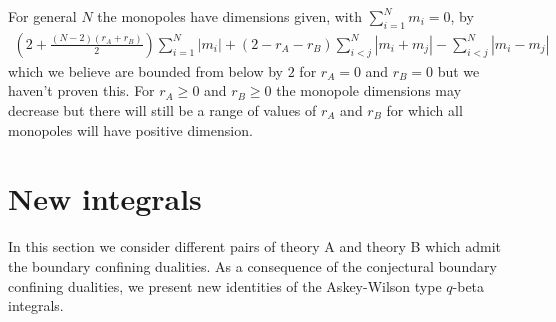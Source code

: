 \documentclass[12pt]{article}
\numberwithin{equation}{section}
\begin{document}
For general $N$ the monopoles have dimensions given, with $\sum_{i=1}^N m_i = 0$, by
\begin{align}
\label{Mono_Ch_suN_6_2}
    \left( 2 + \frac{(N-2)(r_A + r_B)}{2} \right) \sum_{i = 1}^N |m_i| + (2 - r_A - r_B) \sum_{i < j}^N |m_i + m_j| - \sum_{i < j}^N |m_i - m_j|
\end{align}
which we believe are bounded from below by $2$ for $r_A = 0$ and $r_B = 0$ but we haven't proven this. For $r_A \ge 0$ and $r_B \ge 0$ the monopole dimensions may decrease but there will still be a range of values of $r_A$ and $r_B$ for which all monopoles will have positive dimension.


\section{New integrals}
\label{sec_New_integral_identities}
In this section we consider different pairs of theory A and theory B which admit the boundary confining dualities. 
As a consequence of the conjectural boundary confining dualities, we present new identities of the Askey-Wilson type $q$-beta integrals. 
\end{document}
